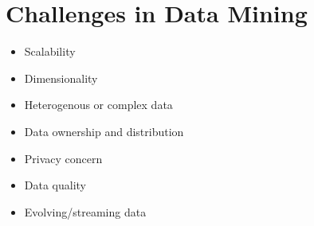 \section{Challenges in Data Mining}
\begin{itemize}
    \item Scalability
    \item Dimensionality
    \item Heterogenous or complex data
    \item Data ownership and distribution
    \item Privacy concern
    \item Data quality
    \item Evolving/streaming data
\end{itemize}

